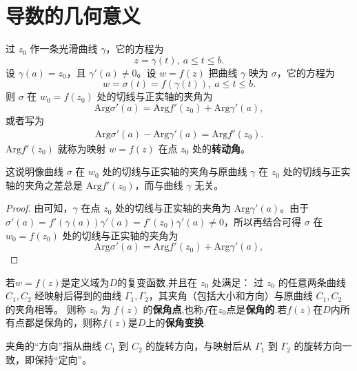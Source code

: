 \documentclass[../../main.tex]{subfiles}
\begin{document}
\section{导数的几何意义}

\begin{proposition}
过 \( z_0 \) 作一条光滑曲线 \( \gamma \)，它的方程为  
\[ z = \gamma(t),\ a \leqslant t \leqslant b. \]  
设 \( \gamma(a) = z_0 \)，且 \( \gamma'(a) \neq 0 \)。设 \( w = f(z) \) 把曲线 \( \gamma \) 映为 \( \sigma \)，它的方程为  
\[ w = \sigma(t) = f(\gamma(t)),\ a \leqslant t \leqslant b. \]  
则 \( \sigma \) 在 \( w_0 = f(z_0) \) 处的切线与正实轴的夹角为  
\[ \mathrm{Arg}\sigma'(a) = \mathrm{Arg} f'(z_0) + \mathrm{Arg} \gamma'(a), \]  
或者写为  
\begin{align}
\mathrm{Arg} \sigma'(a) - \mathrm{Arg} \gamma'(a) = \mathrm{Arg} f'(z_0). \label{equation----:::2.1}
\end{align}
\( \mathrm{Arg} f'(z_0) \) 就称为映射 \( w = f(z) \) 在点 \( z_0 \) 处的\textbf{转动角}。
\end{proposition}
\begin{note}
这说明像曲线 \( \sigma \) 在 \( w_0 \) 处的切线与正实轴的夹角与原曲线 \( \gamma \) 在 \( z_0 \) 处的切线与正实轴的夹角之差总是 \( \mathrm{Arg} f'(z_0) \)，而与曲线 \( \gamma \) 无关。
\end{note}
\begin{proof}
由可知，\( \gamma \) 在点 \( z_0 \) 处的切线与正实轴的夹角为 \( \mathrm{Arg} \gamma'(a) \)。由于 \( \sigma'(a) = f'(\gamma(a))\gamma'(a) = f'(z_0)\gamma'(a) \neq 0 \)，所以再结合可得 \( \sigma \) 在 \( w_0 = f(z_0) \) 处的切线与正实轴的夹角为  
\[ \mathrm{Arg}\sigma'(a) = \mathrm{Arg} f'(z_0) + \mathrm{Arg} \gamma'(a), \]  

\end{proof}

\begin{definition}
若\( w = f(z) \)是定义域为$D$的复变函数,并且在 \( z_0 \) 处满足：  
过 \( z_0 \) 的任意两条曲线 \( C_1, C_2 \) 经映射后得到的曲线 \( \Gamma_1, \Gamma_2 \)，其夹角（包括大小和方向）与原曲线 \( C_1, C_2 \) 的夹角相等。  
则称 \( z_0 \) 为 \( f(z) \) 的\textbf{保角点},也称$f$在$z_0$点是\textbf{保角的}.若\(f(z)\)在$D$内所有点都是保角的，则称\(f(z)\)是$D$上的\textbf{保角变换}.
\end{definition}
\begin{remark}
夹角的“方向”指从曲线 \( C_1 \) 到 \( C_2 \) 的旋转方向，与映射后从 \( \Gamma_1 \) 到 \( \Gamma_2 \) 的旋转方向一致，即保持“定向”。
\end{remark}
\end{document}

